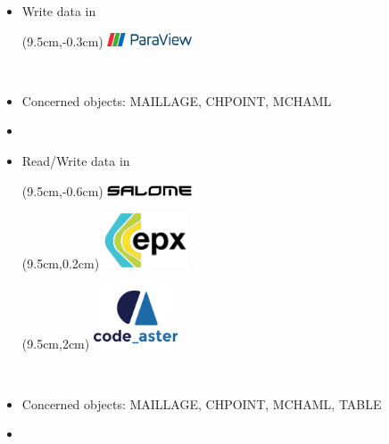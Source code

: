 \begin{frame}{}
  \begin{itemize}
    \item {}
             {Write data in }\\
    \begin{textblock*}{3cm}(9.5cm,-0.3cm)
      \includegraphics[width=2.5cm]{images/paraview}
    \end{textblock*}
    \\
    \footnotesize
    \item[]
              {Concerned objects: MAILLAGE, CHPOINT, MCHAML}
    \item[]
    
    \normalsize
    \item {}
             {Read/Write data in }\\
    \begin{textblock*}{3cm}(9.5cm,-0.6cm)
      \includegraphics[width=2.5cm]{images/salome}
    \end{textblock*}
    \begin{textblock*}{3cm}(9.5cm,0.2cm)
      \includegraphics[width=2.5cm]{images/epx}
    \end{textblock*}
    \begin{textblock*}{3cm}(9.5cm,2cm)
      \includegraphics[width=2.5cm]{images/aster}
    \end{textblock*}
    \\
    \footnotesize
    \item[]
              {Concerned objects: MAILLAGE, CHPOINT, MCHAML, TABLE}
    \item[]
    
    \normalsize
  \end{itemize}
\end{frame}

